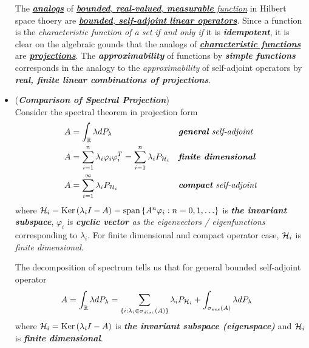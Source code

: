 \documentclass[11pt]{article}
\begin{document}
\begin{itemize}
\begin{remark}
The \underline{\emph{\textbf{analogs}}} of \underline{\emph{\textbf{bounded}, \textbf{real-valued}, \textbf{measurable} function}} in Hilbert space thoery are \underline{\emph{\textbf{bounded}, \textbf{self-adjoint} \textbf{linear operators}}}. Since a function is the \emph{characteristic function of a set} \emph{if and only if} it is \emph{\textbf{idempotent}}, it is clear on the algebraic gounds that the analogs of \underline{\emph{\textbf{characteristic functions}}} are \underline{\emph{\textbf{projections}}}. The \emph{\textbf{approximability}} of functions by \emph{\textbf{simple functions}} corresponds in the analogy to the \emph{approximability} of self-adjoint operators by \emph{\textbf{real, finite linear combinations of projections}}. 
\end{remark}

\item \begin{remark}(\emph{\textbf{Comparison of Spectral Projection}})\\
Consider the spectral theorem in projection form
\begin{align*}
A &= \int_{{\mathbb R}} \lambda dP_{\lambda}  &&\text{\emph{\textbf{general} self-adjoint }}\\
A &= \sum_{i=1}^{n}\lambda_i \varphi_i \varphi_i^{T} =  \sum_{i=1}^{n}\lambda_i P_{{\mathcal H}_i} &&\text{\emph{\textbf{finite dimensional}}} \\
A &=  \sum_{i=1}^{\infty}\lambda_i P_{{\mathcal H}_i} &&\text{\emph{\textbf{compact} self-adjoint}} 
\end{align*} where ${\mathcal H}_i = \text{Ker}\left(\lambda_i I - A\right) = \text{span}\left\{A^n \varphi_i: n=0,1,\ldots\right\}$ is \emph{\textbf{the invariant subspace}}, $\varphi_i$ is \emph{\textbf{cyclic vector} as the eigenvectors / eigenfunctions} corresponding to $\lambda_i$. For finite dimensional and compact operator case, ${\mathcal H}_i$ is \emph{finite dimensional}.

The decomposition of spectrum tells us that for general bounded self-adjoint operator
\begin{align}
A &= \int_{{\mathbb R}} \lambda dP_{\lambda} = \sum_{\left\{i: \lambda_i \in \sigma_{disc}(A)\right\}}\lambda_i P_{{\mathcal H}_i} + \int_{\sigma_{ess}(A)}\lambda dP_{\lambda} \label{eqn: spectral_theorem_decomposition}
\end{align} where ${\mathcal H}_i=\text{Ker}\left(\lambda_i I - A\right)$ is \emph{\textbf{the invariant subspace (eigenspace)}} and ${\mathcal H}_i$ is \emph{\textbf{finite dimensional}}.
\end{remark}
\end{itemize}
\end{document}
